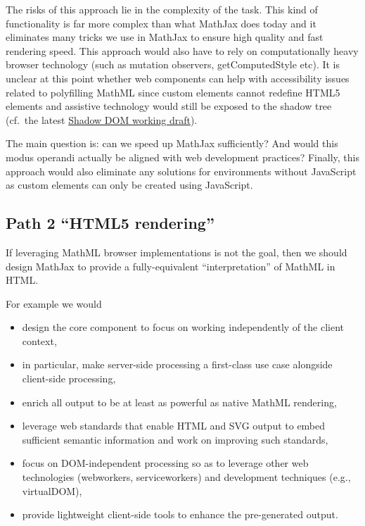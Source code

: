 \documentclass[]{amsart}
\begin{document}
The risks of this approach lie in the complexity of the task. This kind
of functionality is far more complex than what MathJax does today and it
eliminates many tricks we use in MathJax to ensure high quality and fast
rendering speed. This approach would also have to rely on
computationally heavy browser technology (such as mutation observers,
getComputedStyle etc). It is unclear at this point whether web
components can help with accessibility issues related to polyfilling
MathML since custom elements cannot redefine HTML5 elements and
assistive technology would still be exposed to the shadow tree (cf.~the
latest
\href{http://www.w3.org/TR/shadow-dom/\#h-assistive-technology}{Shadow
DOM working draft}).

The main question is: can we speed up MathJax sufficiently? And would
this modus operandi actually be aligned with web development practices?
Finally, this approach would also eliminate any solutions for
environments without JavaScript as custom elements can only be created
using JavaScript.

\subsection{\texorpdfstring{Path 2 ``HTML5
rendering''}{Path 2 HTML5 rendering}}\label{path-2-html5-rendering}

If leveraging MathML browser implementations is not the goal, then we
should design MathJax to provide a fully-equivalent ``interpretation''
of MathML in HTML.

For example we would

\begin{itemize}
\itemsep1pt\parskip0pt
\item
  design the core component to focus on working independently of the
  client context,
\item
  in particular, make server-side processing a first-class use case
  alongside client-side processing,
\item
  enrich all output to be at least as powerful as native MathML
  rendering,
\item
  leverage web standards that enable HTML and SVG output to embed
  sufficient semantic information and work on improving such standards,
\item
  focus on DOM-independent processing so as to leverage other web
  technologies (webworkers, serviceworkers) and development techniques
  (e.g., virtualDOM),
\item
  provide lightweight client-side tools to enhance the pre-generated
  output.
\end{itemize}
\end{document}
